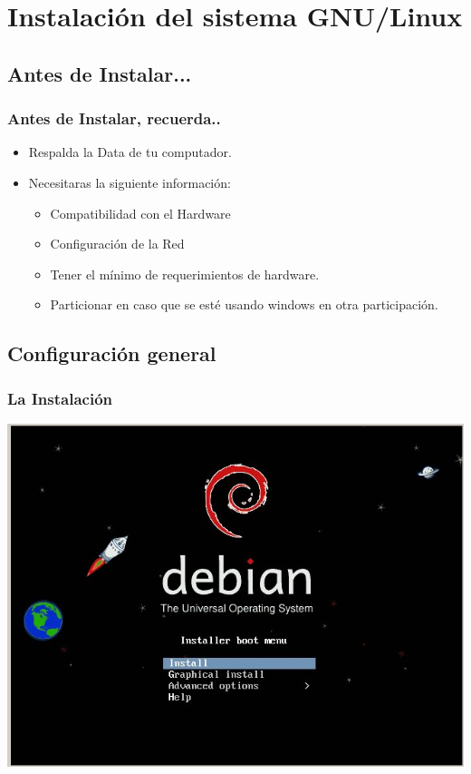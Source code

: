 \documentclass{beamer}
\begin{document}
\section{Instalaci\'on del sistema GNU/Linux}
\subsection{Antes de Instalar...}
\begin{frame}
\frametitle{Antes de Instalar, recuerda..}
	\begin{itemize}
	\item Respalda la Data de tu computador.
	\item Necesitaras la siguiente informaci\'on: 
		\begin{itemize}
		\item Compatibilidad con el Hardware
		\item Configuraci\'on de la Red
		\item Tener el m\'inimo de requerimientos de hardware.
		\item Particionar en caso que se est\'e usando windows en otra participaci\'on.
		\end{itemize}
	\end{itemize}
\end{frame}

\subsection{Configuraci\'on general}
\begin{frame}
\tableofcontents[currentsection]
\end{frame} 


\begin{frame}
\frametitle{La Instalaci\'on}
\includegraphics[height=0.8\textheight]{./imgs/1_inicioCD.jpg} \hspace*{7.3cm}
\end{frame} 
\end{document}
